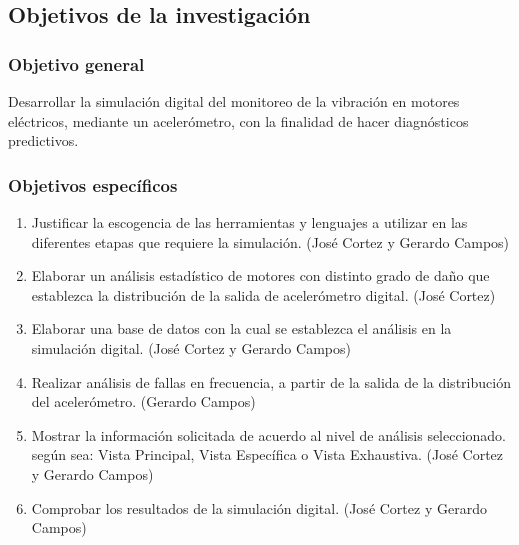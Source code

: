 \subsection{Objetivos de la investigación}

\subsubsection{Objetivo general}
	Desarrollar la simulación digital del monitoreo de la vibración en motores eléctricos, mediante un acelerómetro, con la finalidad de hacer diagnósticos predictivos.

	
\subsubsection{Objetivos específicos}

	\begin{enumerate}
		\item Justificar la escogencia de las herramientas y lenguajes a utilizar en las diferentes etapas que requiere la simulación. (José Cortez y Gerardo Campos)

		\item Elaborar un análisis estadístico de motores con distinto grado de daño que establezca la distribución de la salida de acelerómetro digital. (José Cortez)

		\item Elaborar una base de datos con la cual se establezca el análisis en la simulación digital. (José Cortez y Gerardo Campos) 
		
		\item Realizar análisis de fallas en frecuencia, a partir de la salida de la distribución del acelerómetro. (Gerardo Campos)

		\item Mostrar la información solicitada de acuerdo al nivel de análisis seleccionado. según sea: Vista Principal, Vista Específica o Vista Exhaustiva. (José Cortez y Gerardo Campos)

		\item Comprobar los resultados de la simulación digital. (José Cortez y Gerardo Campos)
	\end{enumerate}

	